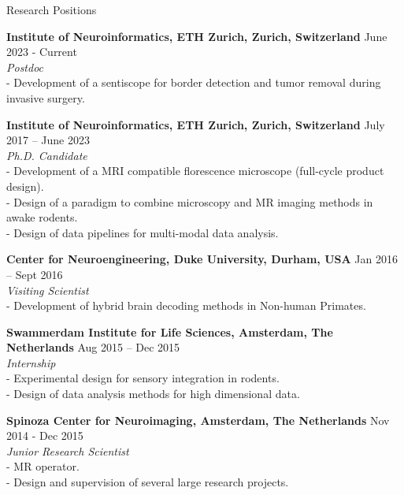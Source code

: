 \documentclass{resume}
\begin{document}
\begin{sections}{Research Positions}

{\bf Institute of Neuroinformatics, ETH Zurich, Zurich, Switzerland} \hfill {June 2023 - Current} 
\\{\textit{Postdoc}}
\\- Development of a sentiscope for border detection and tumor removal during invasive surgery.

{\bf Institute of Neuroinformatics, ETH Zurich, Zurich, Switzerland} \hfill {July 2017 – June 2023} 
\\{\textit{Ph.D. Candidate}}
\\- Development of a MRI compatible florescence microscope (full-cycle product design).
\\- Design of a paradigm to combine microscopy and MR imaging methods in awake rodents. 
\\- Design of data pipelines for multi-modal data analysis.

{\bf Center for Neuroengineering, Duke University, Durham, USA} \hfill {Jan 2016 – Sept 2016} 
\\{\textit{Visiting Scientist}}
\\- Development of hybrid brain decoding methods in Non-human Primates.

{\bf Swammerdam Institute for Life Sciences, Amsterdam, The Netherlands} \hfill {Aug 2015 – Dec 2015} 
\\{\textit{Internship}}
\\- Experimental design for sensory integration in rodents.
\\- Design of data analysis methods for high dimensional data.

{\bf Spinoza Center for Neuroimaging, Amsterdam, The Netherlands} \hfill {Nov 2014 - Dec 2015} 
\\{\textit{Junior Research Scientist}}
\\- MR operator.
\\- Design and supervision of several large research projects.

\end{sections}

\cleardoublepage
\end{document}
